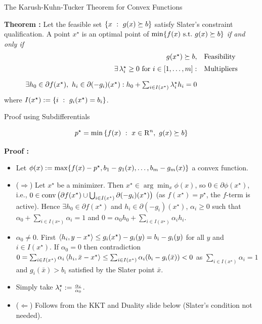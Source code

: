 \documentclass[9pt]{beamer}
\begin{document}
\begin{frame}{The Karush-Kuhn-Tucker Theorem for Convex Functions}

  \vfill
  
  \textbf{Theorem :} Let the feasible set $\left\{ x\ : \ g(x)\succeq b \right\}$ satisfy Slater's constraint qualification.
  A point $x^\star$ is an optimal point of $\min \{f(x)~ \mathrm{s.t.}~ g(x)\succeq b\}$ \emph{if and only if}
  \[
  \begin{array}{rl}
    g(x^\star) \succeq b, & {\rm{Feasibility}}\\[0.5em]
    \exists\, \lambda_i^\star\geq 0 {\rm{~for~}} i \in [1, \dots, m]: & {\rm{Multipliers}} \\[1em]
    \exists h_0 \in \partial f(x^\star), ~h_i\in\partial(-g_i)(x^\star) : h_0 + \sum_{i \in I(x^\star)} \lambda_i^\star h_i = 0 &
  \end{array}
  \]
  where $I(x^\star) := \left\{ i\ : \ g_i(x^\star)=b_i \right\}$.
  
\end{frame}

\begin{frame}{Proof using Subdifferentials}

  \[
    p^\star  = \min\left\{ f(x)\ : \ x\in \mathrm{R}^n, ~g(x)\succeq b \right\}
  \]

  \vfill

  \textbf{Proof : }
  \begin{itemize}
    \setlength\itemsep{1em}
  \item Let $\phi(x):= \max \{f(x) - p^\star, b_1 - g_1(x), \dots, b_m-g_m(x)\}$ a convex function.
  \item<2-> ($\Rightarrow$) Let $x^\star$ be a minimizer. Then $x^\star \in \arg \min_x \phi(x)$, so $0\in \partial \phi(x^\star)$, i.e., $0 \in \operatorname{conv}\big(\partial f(x^\star) \cup \textstyle\bigcup_{i \in I(x^\star)} \partial(-g_i)(x^\star)\big)$ (as $f(x^\star)=p^\star$, the $f$-term is active). Hence $\exists h_0 \in \partial f(x^\star)$ and $h_i \in \partial(-g_i)(x^\star)$, $\alpha_i\geq 0$ such that $\alpha_0+\sum_{i\in I(x^\star)} \alpha_i=1$ and $0 = \alpha_0 h_0 + \sum_{i\in I(x^\star)} \alpha_i h_i$.
  \item<3-> $\alpha_0\neq 0$. First $\left<h_i, y-x^\star\right> \leq g_i(x^\star) -g_i(y) = b_i - g_i(y)$ for all $y$ and $i \in I(x^\star)$. If $\alpha_0=0$ then contradiction $0 = \sum_{i\in I(x^\star)} \alpha_i \left<h_i, \bar x - x^\star\right> \leq \sum_{i\in I(x^\star)} \alpha_i (b_i - g_i(\bar x))<0$ as $\sum_{i\in I(x^\star)} \alpha_i=1$ and $g_i(\bar x)>b_i$ satisfied by the Slater point $\bar x$.
  \item<4-> Simply take $\lambda_i^\star := \frac{\alpha_i}{\alpha_0}$.
  \item<5-> ($\Leftarrow$) Follows from the KKT and Duality slide below (Slater's condition not needed).
  \end{itemize}
  
\end{frame}
\end{document}
